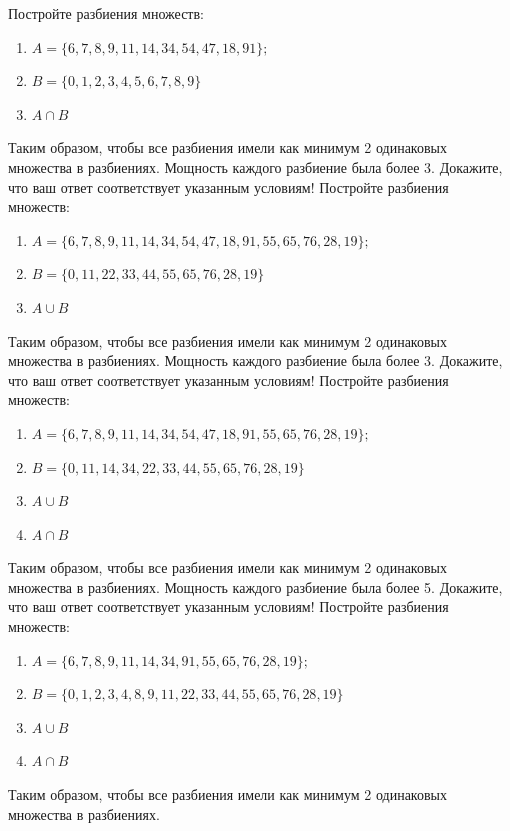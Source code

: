 \documentclass[10pt]{exam}
\begin{document}
\begin{questions}
\question
Постройте разбиения множеств:
\begin{enumerate}
	\renewcommand{\labelenumi}{\alph{enumi})}
	\item $A = \{6, 7, 8, 9, 11, 14, 34, 54, 47, 18, 91\};$
	\item $B = \{0, 1, 2, 3, 4, 5, 6, 7, 8, 9\}$
	\item $A \cap B$
\end{enumerate}
Таким образом, чтобы все разбиения имели как минимум 2 одинаковых множества в разбиениях.
Мощность каждого разбиение была более 3.
Докажите, что ваш ответ соответствует указанным условиям!\question
Постройте разбиения множеств:
\begin{enumerate}
	\renewcommand{\labelenumi}{\alph{enumi})}
	\item $A = \{6, 7, 8, 9, 11, 14, 34, 54, 47, 18, 91, 55, 65, 76, 28, 19\};$
	\item $B = \{0, 11, 22, 33, 44, 55, 65, 76, 28, 19\}$
	\item $A \cup B$
\end{enumerate}
Таким образом, чтобы все разбиения имели как минимум 2 одинаковых множества в разбиениях.
Мощность каждого разбиение была более 3.
Докажите, что ваш ответ соответствует указанным условиям!
\question
Постройте разбиения множеств:
\begin{enumerate}
	\renewcommand{\labelenumi}{\alph{enumi})}
	\item $A = \{6, 7, 8, 9, 11, 14, 34, 54, 47, 18, 91, 55, 65, 76, 28, 19\};$
	\item $B = \{0, 11, 14, 34, 22, 33, 44, 55, 65, 76, 28, 19\}$
	\item $A \cup B$
	\item $A \cap B$
\end{enumerate}
Таким образом, чтобы все разбиения имели как минимум 2 одинаковых множества в разбиениях.
Мощность каждого разбиение была более 5.
Докажите, что ваш ответ соответствует указанным условиям!
\question
Постройте разбиения множеств:
\begin{enumerate}
	\renewcommand{\labelenumi}{\alph{enumi})}
	\item $A = \{6, 7, 8, 9, 11, 14, 34, 91, 55, 65, 76, 28, 19\};$
	\item $B = \{0, 1, 2, 3, 4, 8, 9, 11, 22, 33, 44, 55, 65, 76, 28, 19\}$
	\item $A \cup B$
	\item $A \cap B$
\end{enumerate}
Таким образом, чтобы все разбиения имели как минимум 2 одинаковых множества в разбиениях.

\end{questions}
\end{document}
